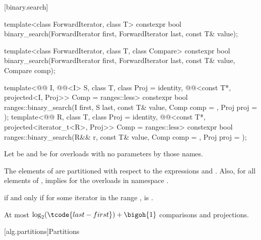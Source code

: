 [binary.search]{}

%
\begin{itemdecl}
template<class ForwardIterator, class T>
  constexpr bool
    binary_search(ForwardIterator first, ForwardIterator last,
                  const T& value);

template<class ForwardIterator, class T, class Compare>
  constexpr bool
    binary_search(ForwardIterator first, ForwardIterator last,
                  const T& value, Compare comp);

template<@@ I, @@<I> S, class T, class Proj = identity,
         @@<const T*, projected<I, Proj>> Comp = ranges::less>
  constexpr bool ranges::binary_search(I first, S last, const T& value, Comp comp = {},
                                       Proj proj = {});
template<@@ R, class T, class Proj = identity,
         @@<const T*, projected<iterator_t<R>, Proj>> Comp =
           ranges::less>
  constexpr bool ranges::binary_search(R&& r, const T& value, Comp comp = {},
                                       Proj proj = {});
\end{itemdecl}

\begin{itemdescr}
\pnum
Let  be  and
 be 
for overloads with no parameters by those names.

\pnum
\expects
The elements  of 
are partitioned with respect to the expressions
 and
.
Also, for all elements  of ,
 implies 
for the overloads in namespace .

\pnum
\returns
{} if and only if
for some iterator  in the range ,
is .

\pnum
\complexity
At most $\log_2(\tcode{last - first}) + \bigoh{1}$ comparisons and projections.
\end{itemdescr}

[alg.partitions]{Partitions}

